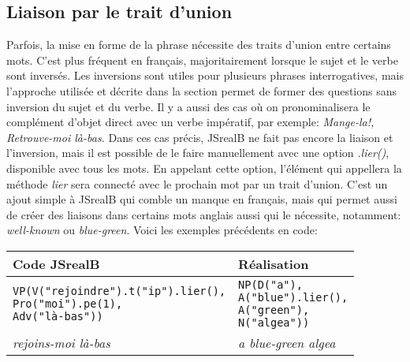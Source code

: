 \documentclass[11pt]{article} %
\newcommand{\real}[1]{\emph{#1}}
\begin{document}
\subsection{Liaison par le trait d'union}
Parfois, la mise en forme de
la phrase nécessite des traits d'union entre certains mots. C'est
plus fréquent en français, majoritairement lorsque le sujet et le
verbe sont inversés.  Les inversions sont utiles pour plusieurs phrases
interrogatives, mais l'approche utilisée et décrite dans la section \hyperref[question]{}
 permet de former des questions sans inversion du sujet
et du verbe. Il y a aussi des cas où on pronominalisera le complément
d'objet direct avec un verbe impératif, par exemple: \emph{Mange-la!,
Retrouve-moi là-bas. }Dans ces cas précis, JSrealB ne fait pas encore
la liaison et l'inversion, mais il est possible de le faire manuellement
avec une option \emph{.lier()}, disponible avec tous les mots. En
appelant cette option, l'élément qui appellera la méthode \emph{lier}
sera connecté avec le prochain mot par un trait d'union. C'est un
ajout simple à JSrealB qui comble un manque en français, mais qui
permet aussi de créer des liaisons dans certains mots anglais aussi
qui le nécessite, notamment: \emph{well-known} ou \emph{blue-green}. Voici les exemples
précédents en code:
\begin{tabular}{|p{7cm}|p{7cm}|}
\hline 
Code JSrealB & Réalisation\\
\hline 
\hline
\begin{alltt}
VP(V("rejoindre").t("ip").lier(),
   Pro("moi").pe(1),
   Adv("là-bas"))
\end{alltt} &
\begin{alltt}
NP(D("a"),
   A("blue").lier(),
   A("green"),
   N("algea"))
\end{alltt} \\
\hline 
\real{rejoins-moi là-bas} & \real{a blue-green algea}\\
\hline 
\end{tabular}
\end{document}
